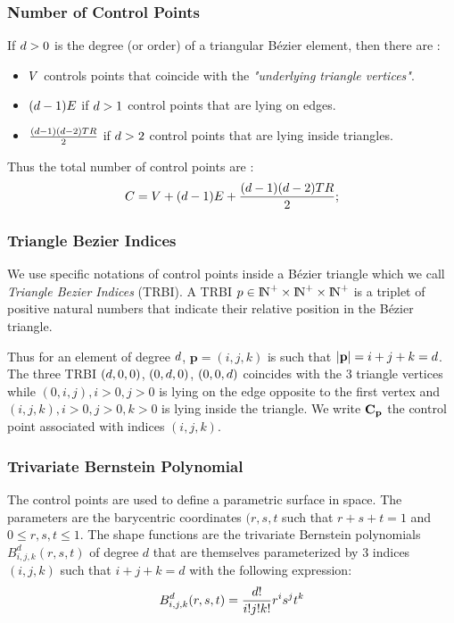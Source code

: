 \documentclass[a4paper,11pt]{article}
\newcommand{\Bezier}{{B{\'e}zier }}
\begin{document}
\subsubsection{Number of Control Points}

If ${d}>0$ is the degree (or order) of a triangular \Bezier  element, then there are :

\begin{itemize}
	\item ${ V}$ controls points that coincide with the {\em "underlying triangle vertices"}.
	\item $({d}-1) { E}$ if ${d}>1$ control points that are lying on edges. 
	\item $\frac{({d}-1) ({d}-2) { TR}}{2}$ if ${d}>2$ control points that are lying inside triangles. 
\end{itemize}

Thus the total number of control points are :
\[
{C}={ V}+({d}-1) { E}+\frac{({d}-1) ({d}-2) { TR}}{2};
\]
\subsubsection{Triangle Bezier Indices}

We use specific notations of control points inside a \Bezier triangle which we call {\em Triangle Bezier Indices} (TRBI).
A TRBI $p\in {\rm I\!N}^{+}\times{\rm I\!N}^{+}\times{\rm I\!N}^{+}$ is a triplet of positive natural numbers that indicate their relative position in the \Bezier triangle. 

Thus for an element of degree ${d}$, ${\mathbf p}=(i,j,k)$ is such that $|{\mathbf p}|=i+j+k={d}$.  The three TRBI $({d},0,0)$, $(0,{d},0)$, $(0,0,{d})$ coincides with the 3 triangle vertices while $(0,i,j), i>0, j>0$ is lying on the edge opposite to the first vertex and   $(i,j,k), i>0, j>0, k>0$ is lying inside the triangle. We write ${\mathbf C}_{\mathbf p}$ the control point associated with indices $(i,j,k)$.

\subsubsection{Trivariate Bernstein Polynomial}

The control points are used to define a parametric surface in space. The parameters are the barycentric coordinates $(r,s,t$ such that $r+s+t=1$ and $0\leq r,s,t\leq 1$. The shape functions are the trivariate Bernstein polynomials $B^d_{i,j,k}(r,s,t)$ of degree $d$ that are themselves parameterized by 3 indices $(i,j,k)$ such that $i+j+k=d$ with the following expression:
\[
B^{d}_{i,j,k}(r,s,t)=\frac{{d}!}{i! j! k! } r^i s^j t^k 
\]
\end{document}
